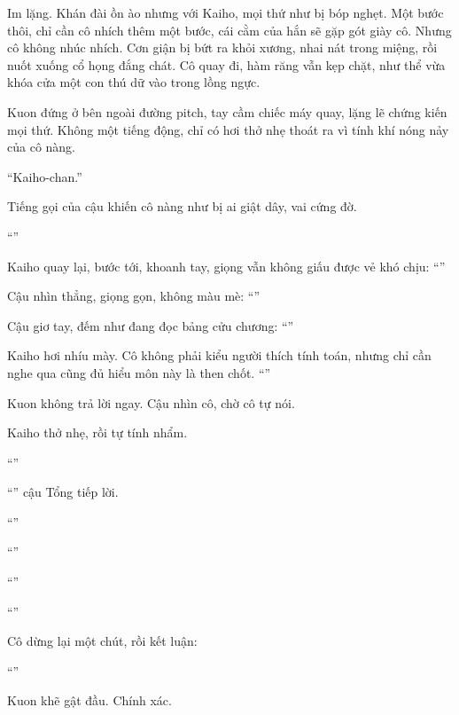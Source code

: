 \documentclass[../main.tex]{subfiles}
\begin{document}
Im lặng. Khán đài ồn ào nhưng với Kaiho, mọi thứ như bị bóp nghẹt. Một bước thôi, chỉ cần cô nhích thêm một bước, cái cằm của hắn sẽ gặp gót giày cô. Nhưng cô không nhúc nhích. Cơn giận bị bứt ra khỏi xương, nhai nát trong miệng, rồi nuốt xuống cổ họng đắng chát. Cô quay đi, hàm răng vẫn kẹp chặt, như thể vừa khóa cửa một con thú dữ vào trong lồng ngực.

Kuon đứng ở bên ngoài đường pitch, tay cầm chiếc máy quay, lặng lẽ chứng kiến mọi thứ. Không một tiếng động, chỉ có hơi thở nhẹ thoát ra vì tính khí nóng nảy của cô nàng.

``Kaiho-chan.''

Tiếng gọi của cậu khiến cô nàng như bị ai giật dây, vai cứng đờ.

``''

Kaiho quay lại, bước tới, khoanh tay, giọng vẫn không giấu được vẻ khó chịu: ``''

Cậu nhìn thẳng, giọng gọn, không màu mè: ``''

Cậu giơ tay, đếm như đang đọc bảng cửu chương: ``''

Kaiho hơi nhíu mày. Cô không phải kiểu người thích tính toán, nhưng chỉ cần nghe qua cũng đủ hiểu môn này là then chốt. ``''

Kuon không trả lời ngay. Cậu nhìn cô, chờ cô tự nói.

Kaiho thở nhẹ, rồi tự tính nhẩm.

``''

``'' cậu Tổng tiếp lời.

``''

``''

``''

``''

Cô dừng lại một chút, rồi kết luận:

``''

Kuon khẽ gật đầu. Chính xác.
\end{document}
